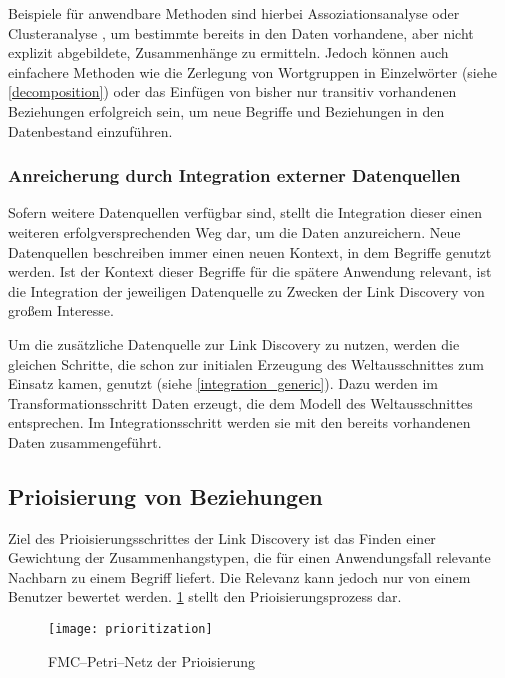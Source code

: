 Beispiele für anwendbare Methoden sind hierbei Assoziationsanalyse \cite[S. 328f.]{pt2013} oder Clusteranalyse \cite[S. 443f.]{hkp2012}, um bestimmte bereits in den Daten vorhandene, aber nicht explizit abgebildete, Zusammenhänge zu ermitteln. Jedoch können auch einfachere Methoden wie die Zerlegung von Wortgruppen in Einzelwörter (siehe \cref{decomposition}) oder das Einfügen von bisher nur transitiv vorhandenen Beziehungen erfolgreich sein, um neue Begriffe und Beziehungen in den Datenbestand einzuführen.

\subsubsection{Anreicherung durch Integration externer Datenquellen}
\label{enrichment_external}

Sofern weitere Datenquellen verfügbar sind, stellt die Integration dieser einen weiteren erfolgversprechenden Weg dar, um die Daten anzureichern. Neue Datenquellen beschreiben immer einen neuen Kontext, in dem Begriffe genutzt werden. Ist der Kontext dieser Begriffe für die spätere Anwendung relevant, ist die Integration der jeweiligen Datenquelle zu Zwecken der Link Discovery von großem Interesse.

Um die zusätzliche Datenquelle zur Link Discovery zu nutzen, werden die gleichen Schritte, die schon zur initialen Erzeugung des Weltausschnittes zum Einsatz kamen, genutzt (siehe \cref{integration_generic}). Dazu werden im Transformationsschritt Daten erzeugt, die dem Modell des Weltausschnittes entsprechen. Im Integrationsschritt werden sie mit den bereits vorhandenen Daten zusammengeführt.

\subsection{Prioisierung von Beziehungen}
\label{prioritization}

Ziel des Prioisierungsschrittes der Link Discovery ist das Finden einer Gewichtung der Zusammenhangstypen, die für einen Anwendungsfall relevante Nachbarn zu einem Begriff liefert. Die Relevanz kann jedoch nur von einem Benutzer bewertet werden. \cref{fig:prioritization} stellt den Prioisierungsprozess dar.

\begin{figure}
\centering
\texttt{[image: prioritization]}
\caption{FMC--Petri--Netz der Prioisierung}
\label{fig:prioritization}
\end{figure}

